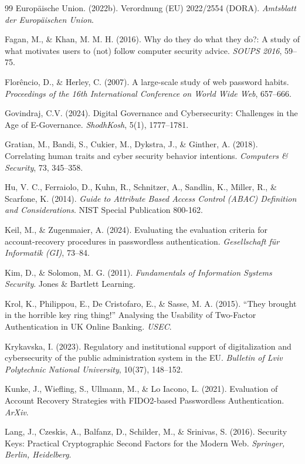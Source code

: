 \begin{thebibliography}{99}
Europäische Union. (2022b). Verordnung (EU) 2022/2554 (DORA). \textit{Amtsblatt der Europäischen Union}.

Fagan, M., \& Khan, M. M. H. (2016). Why do they do what they do?: A study of what motivates users to (not) follow computer security advice. \textit{SOUPS 2016}, 59--75.

Florêncio, D., \& Herley, C. (2007). A large-scale study of web password habits. \textit{Proceedings of the 16th International Conference on World Wide Web}, 657--666.

Govindraj, C.V. (2024). Digital Governance and Cybersecurity: Challenges in the Age of E-Governance. \textit{ShodhKosh}, 5(1), 1777--1781.

Gratian, M., Bandi, S., Cukier, M., Dykstra, J., \& Ginther, A. (2018). Correlating human traits and cyber security behavior intentions. \textit{Computers \& Security}, 73, 345--358.

Hu, V. C., Ferraiolo, D., Kuhn, R., Schnitzer, A., Sandlin, K., Miller, R., \& Scarfone, K. (2014). \textit{Guide to Attribute Based Access Control (ABAC) Definition and Considerations}. NIST Special Publication 800-162.

Keil, M., \& Zugenmaier, A. (2024). Evaluating the evaluation criteria for account-recovery procedures in passwordless authentication. \textit{Gesellschaft für Informatik (GI)}, 73--84.

Kim, D., \& Solomon, M. G. (2011). \textit{Fundamentals of Information Systems Security}. Jones \& Bartlett Learning.

Krol, K., Philippou, E., De Cristofaro, E., \& Sasse, M. A. (2015). ``They brought in the horrible key ring thing!'' Analysing the Usability of Two-Factor Authentication in UK Online Banking. \textit{USEC}.

Krykavska, I. (2023). Regulatory and institutional support of digitalization and cybersecurity of the public administration system in the EU. \textit{Bulletin of Lviv Polytechnic National University}, 10(37), 148--152.

Kunke, J., Wiefling, S., Ullmann, M., \& Lo Iacono, L. (2021). Evaluation of Account Recovery Strategies with FIDO2-based Passwordless Authentication. \textit{ArXiv}.

Lang, J., Czeskis, A., Balfanz, D., Schilder, M., \& Srinivas, S. (2016). Security Keys: Practical Cryptographic Second Factors for the Modern Web. \textit{Springer, Berlin, Heidelberg}.


\end{thebibliography}
